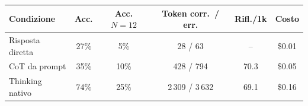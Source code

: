 \begin{tabular}{lccccc}
\toprule
Condizione & Acc. & Acc. $N{=}12$ & Token corr.\ / err. & Rifl./1k & Costo \\
\midrule
Risposta diretta & 27\% & 5\% & 28 / 63 & -- & \$0.01 \\
CoT da prompt & 35\% & 10\% & 428 / 794 & 70.3 & \$0.05 \\
Thinking nativo & 74\% & 25\% & 2\,309 / 3\,632 & 69.1 & \$0.16 \\
\bottomrule
\end{tabular}
